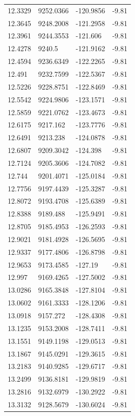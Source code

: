 \begin{table}[H]
\begin{tabular}{llll}
12.3329 & 9252.0366 & -120.9856 & -9.81 \\
12.3645 & 9248.2008 & -121.2958 & -9.81 \\
12.3961 & 9244.3553 & -121.606 & -9.81 \\
12.4278 & 9240.5 & -121.9162 & -9.81 \\
12.4594 & 9236.6349 & -122.2265 & -9.81 \\
12.491 & 9232.7599 & -122.5367 & -9.81 \\
12.5226 & 9228.8751 & -122.8469 & -9.81 \\
12.5542 & 9224.9806 & -123.1571 & -9.81 \\
12.5859 & 9221.0762 & -123.4673 & -9.81 \\
12.6175 & 9217.162 & -123.7776 & -9.81 \\
12.6491 & 9213.238 & -124.0878 & -9.81 \\
12.6807 & 9209.3042 & -124.398 & -9.81 \\
12.7124 & 9205.3606 & -124.7082 & -9.81 \\
12.744 & 9201.4071 & -125.0184 & -9.81 \\
12.7756 & 9197.4439 & -125.3287 & -9.81 \\
12.8072 & 9193.4708 & -125.6389 & -9.81 \\
12.8388 & 9189.488 & -125.9491 & -9.81 \\
12.8705 & 9185.4953 & -126.2593 & -9.81 \\
12.9021 & 9181.4928 & -126.5695 & -9.81 \\
12.9337 & 9177.4806 & -126.8798 & -9.81 \\
12.9653 & 9173.4585 & -127.19 & -9.81 \\
12.997 & 9169.4265 & -127.5002 & -9.81 \\
13.0286 & 9165.3848 & -127.8104 & -9.81 \\
13.0602 & 9161.3333 & -128.1206 & -9.81 \\
13.0918 & 9157.272 & -128.4308 & -9.81 \\
13.1235 & 9153.2008 & -128.7411 & -9.81 \\
13.1551 & 9149.1198 & -129.0513 & -9.81 \\
13.1867 & 9145.0291 & -129.3615 & -9.81 \\
13.2183 & 9140.9285 & -129.6717 & -9.81 \\
13.2499 & 9136.8181 & -129.9819 & -9.81 \\
13.2816 & 9132.6979 & -130.2922 & -9.81 \\
13.3132 & 9128.5679 & -130.6024 & -9.81 \\

\end{tabular}
\end{table}
